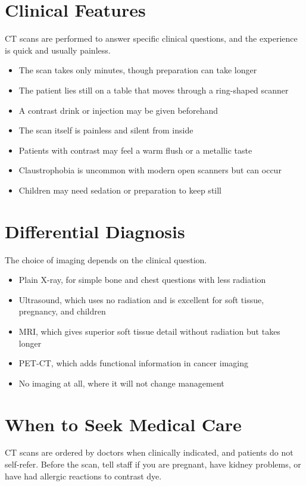 \section*{Clinical Features}
CT scans are performed to answer specific clinical questions, and the experience is quick and usually painless.

\begin{itemize}
    \item The scan takes only minutes, though preparation can take longer
    \item The patient lies still on a table that moves through a ring-shaped scanner
    \item A contrast drink or injection may be given beforehand
    \item The scan itself is painless and silent from inside
    \item Patients with contrast may feel a warm flush or a metallic taste
    \item Claustrophobia is uncommon with modern open scanners but can occur
    \item Children may need sedation or preparation to keep still
\end{itemize}

\section*{Differential Diagnosis}
The choice of imaging depends on the clinical question.

\begin{itemize}
    \item Plain X-ray, for simple bone and chest questions with less radiation
    \item Ultrasound, which uses no radiation and is excellent for soft tissue, pregnancy, and children
    \item MRI, which gives superior soft tissue detail without radiation but takes longer
    \item PET-CT, which adds functional information in cancer imaging
    \item No imaging at all, where it will not change management
\end{itemize}

\section*{When to Seek Medical Care}
CT scans are ordered by doctors when clinically indicated, and patients do not self-refer. Before the scan, tell staff if you are pregnant, have kidney problems, or have had allergic reactions to contrast dye.

